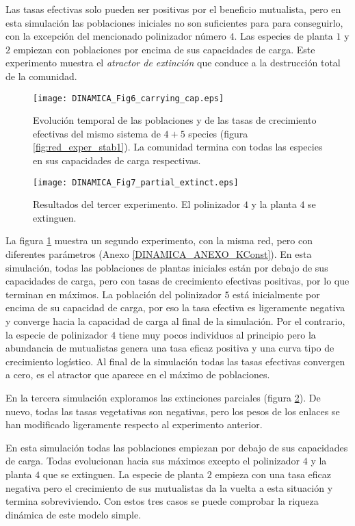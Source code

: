 Las tasas efectivas solo pueden ser positivas por el beneficio mutualista, pero en esta simulación las poblaciones iniciales no son suficientes para para conseguirlo, con la excepción del mencionado polinizador número $4$. Las especies de planta $1$ y $2$ empiezan con poblaciones por encima de sus capacidades de carga.
Este experimento muestra el \textit{atractor de extinción} que conduce a la destrucción total de la comunidad.

\begin{figure}[ht!]
\centering
\texttt{[image: DINAMICA\_Fig6\_carrying\_cap.eps]}
\caption {Evolución temporal de las poblaciones y de las tasas de crecimiento efectivas del mismo sistema de $4+5$ species (figura \ref{fig:red_exper_stab1}). La comunidad termina con todas las especies en sus capacidades de carga respectivas.}
\label{fig:exper_carrying_cap}
\end{figure}

\begin{figure}[h!]
\centering
\texttt{[image: DINAMICA\_Fig7\_partial\_extinct.eps]}
\caption {Resultados del tercer experimento. El polinizador $4$ y la planta $4$ se extinguen.}
\label{fig:exper_stab2}
\end{figure}

La figura \ref{fig:exper_carrying_cap} muestra un segundo experimento, con la misma red, pero con diferentes parámetros (Anexo \ref{DINAMICA_ANEXO_KConst}). En esta simulación, todas las poblaciones de plantas iniciales están por debajo de sus capacidades de carga, pero con tasas de crecimiento efectivas positivas, por lo que terminan en máximos. La población del polinizador $5$ está inicialmente por encima de su capacidad de carga, por eso la tasa efectiva es ligeramente negativa y converge hacia la capacidad de carga al final de la simulación. Por el contrario, la especie de polinizador $4$ tiene muy pocos individuos al principio pero la abundancia de mutualistas genera una tasa eficaz positiva y una curva tipo de crecimiento logístico. Al final de la simulación todas las tasas efectivas convergen a cero, es el atractor que aparece en el máximo de poblaciones.

En la tercera simulación exploramos las extinciones parciales (figura \ref{fig:exper_stab2}). De nuevo, todas las tasas vegetativas son negativas, pero los pesos de los enlaces se han modificado ligeramente respecto al experimento anterior.

En esta simulación todas las poblaciones empiezan por debajo de sus capacidades de carga. Todas evolucionan hacia sus máximos excepto el polinizador $4$ y la planta $4$ que se extinguen. La especie de planta $2$ empieza con una tasa eficaz negativa pero el crecimiento de sus mutualistas da la vuelta a esta situación y termina sobreviviendo. Con estos tres casos se puede comprobar la riqueza dinámica de este modelo simple.

